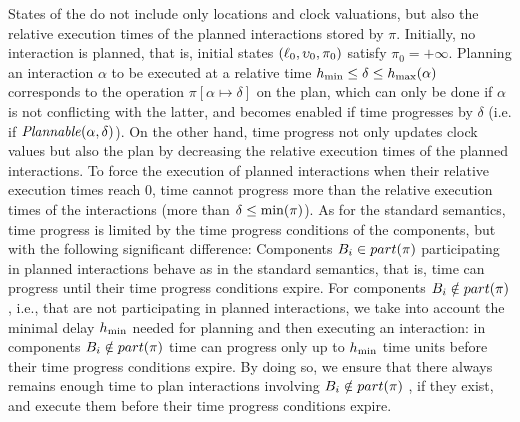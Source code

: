 States of the \lpsabrb do not include only locations and clock valuations, 
but also the relative execution times of the planned interactions stored by $\pi$.
Initially, no interaction is planned, that is, initial states $(\ell_0,\upsilon_0,\pi_0)$ 
satisfy $\pi_0 = +\infty$.
Planning an interaction $\alpha$ to be executed at a relative time $h_{\min}\le\delta\le h_{\max}
(\alpha)$ corresponds to the operation $\pi [ \alpha\mapsto\delta ]$ on the plan, 
which can only be done if $\alpha$ is not conflicting with the latter, and becomes enabled if 
time progresses by $\delta$ (i.e. if $\mathit{Plannable(\alpha,\delta)}$).
On the other hand, time progress not only updates clock values but also the plan by 
decreasing the relative execution times of the planned interactions.
To force the execution of planned interactions when their relative execution times reach $0$, 
time cannot progress more than the relative execution times of the interactions 
(more than $\delta \le \min(\pi)$).
As for the standard semantics, time progress is limited by the time progress conditions 
of the components, but with the following significant difference:
Components $B_i \in part(\pi)$ participating in planned interactions behave as in the standard 
semantics, that is, time can progress until their time progress conditions expire.
For components $B_i \notin part(\pi)$, i.e., that are not participating in planned interactions, 
we take into account the minimal delay $h_{\min}$ needed for planning and then executing an 
interaction: in components $B_i \notin part(\pi)$ time can progress only up to $h_{\min}$ time 
units before their time progress conditions expire.
By doing so, we ensure that there always remains enough time to plan interactions involving 
$B_i \notin part(\pi)$ , if they exist, and execute them before their time progress conditions 
expire.
 
